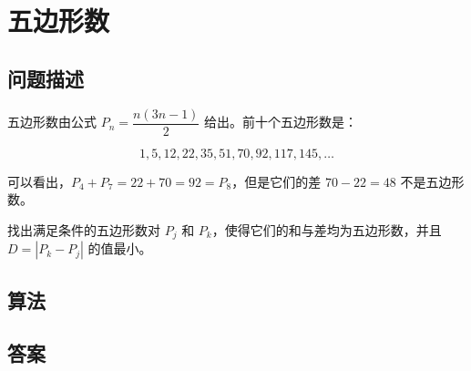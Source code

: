 \section{五边形数}
\subsection{问题描述}
\begin{tcolorbox}
	五边形数由公式 $P_n = \dfrac{n(3n-1)}{2}$ 给出。前十个五边形数是：

	\[
		1, 5, 12, 22, 35, 51, 70, 92, 117, 145, \dots
	\]

	可以看出，$P_4 + P_7 = 22 + 70 = 92 = P_8$，但是它们的差 $70 - 22 = 48$ 不是五边形数。

	找出满足条件的五边形数对 $P_j$ 和 $P_k$，使得它们的和与差均为五边形数，并且 $D = |P_k - P_j|$ 的值最小。
\end{tcolorbox}

\subsection{算法}


\subsection{答案}
